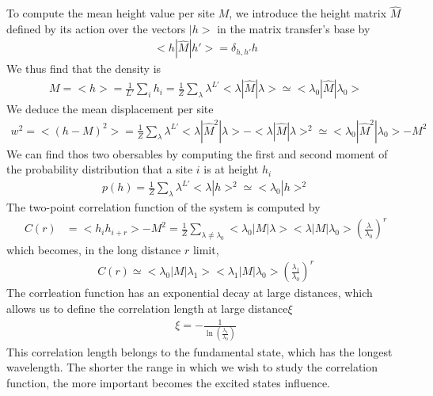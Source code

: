 {To compute the mean height value per site $M$, we introduce the height matrix $\hat{M}$ defined by its action over the vectors $|h>$ in the matrix transfer's base by
\begin{align}
    <h|\hat{M} |h'> = \delta_{h,h'} h
\end{align}
We thus find that the density is
\begin{align}
	M = < h > = \frac{1}{L'} \sum_i h_i =  \frac{1}{Z} \sum_\lambda \lambda^{L'} < \lambda | \hat{M} | \lambda > \simeq < \lambda_0 | \hat{M} | \lambda_0 > 
	\label{tm-magnetisation}
\end{align}
We deduce the mean displacement per site
\begin{align}
	w^2 = < (h - M)^2 > = \frac{1}{Z} \sum_\lambda \lambda^{L'} < \lambda | \hat{M}^2 | \lambda > - < \lambda | \hat{M}| \lambda >^2  \simeq  < \lambda_0 | \hat{M}^2 | \lambda_0 > - M^2
\end{align}
We can find thos two obersables by computing the first and second moment of the probability distribution that a site $i$ is at height $h_i$
\begin{align}
	p(h) = \frac{1}{Z} \sum_\lambda \lambda^{L'} <\lambda | h >^2 \simeq < \lambda_0 | h >^2
\end{align}
The two-point correlation function of the system is computed by
\begin{align}
    C(r) &= < h_i h_{i+r} > - M^2 = \frac{1}{Z} \sum_{\lambda \neq \lambda_0} < \lambda_0 | M | \lambda > < \lambda | M | \lambda_0 > \left( \frac{\lambda}{\lambda_0} \right)^r  
\end{align}
which becomes, in the long distance $r$ limit, 
\begin{align}
    C(r) \simeq < \lambda_0 | M | \lambda_1 > < \lambda_1 | M | \lambda_0 > \left( \frac{\lambda_1}{\lambda_0} \right)^r
\end{align}
The corrleation function has an exponential decay at large distances, which allows us to define the correlation length at large distance$\xi$
\begin{align}
    \xi = - \frac{1}{\ln(\frac{\lambda_1}{\lambda_0})}
    \label{longueur-correl-thermo}
\end{align}
{\color{purple} This correlation length belongs to the fundamental state, which has the longest wavelength. The shorter the range in which we wish to study the correlation function, the more important becomes the excited states influence.}
}
%
